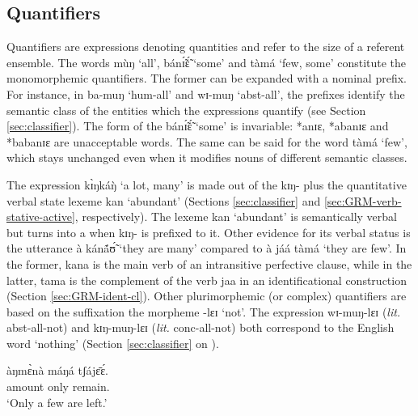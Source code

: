 \begin{exe}
\begin{exe}
\begin{exe}
\begin{exe}
\begin{exe}
\begin{exe}
\begin{exe}
\begin{exe}
\begin{exe}


\subsection{Quantifiers}
\label{sec:GRM-quantifier}



Quantifiers are expressions denoting quantities and refer to the size of a referent ensemble. The words {\sls mùŋ} `all',   {\sls bánɪ̃́ɛ̃́} `some' and {\sls tàmá} `few, some' constitute the  monomorphemic quantifiers. The  former can be expanded with a  nominal prefix. For instance, in {\sls ba-muŋ} `{\sc hum}-all' and {\sls wɪ-muŋ} `{\sc abst}-all',  the prefixes identify the semantic class of the entities which the expressions quantify (see Section \ref{sec:classifier}). The form of the  {\sls bánɪ̃́ɛ̃́} `some'  is  invariable: *{\sls anɪɛ}, *{\sls abanɪɛ} and *{\sls babanɪɛ} are unacceptable words.  The same can be said for the word {\sls tàmá} `few', which stays unchanged even  when it  modifies  nouns of different semantic classes. 

The expression {\sls kɪ̀ŋkáŋ̀} `a lot, many'   is made out of the    {\sls kɪŋ-} plus the quantitative verbal state lexeme {\sls kan}  `abundant'   (Sections  \ref{sec:classifier} and \ref{sec:GRM-verb-stative-active}, respectively). The  lexeme {\sls kan} `abundant'  is semantically verbal but turns into a  when {\sls kɪŋ-}  is prefixed to it.  Other evidence for its verbal status  is the utterance {\sls à kánã́ʊ̃́} `they are many' compared to {\sls à jáá tàmá} `they are few'.  In the former, {\sls kana} is the main verb of an intransitive perfective clause, while in the latter, {\sls tama} is the complement of the verb {\sls jaa} in an identificational construction  (Section \ref{sec:GRM-ident-cl}). Other plurimorphemic (or complex) quantifiers are based on the suffixation the morpheme {\sls  -lɛɪ} `not'. The expression {\sls wɪ-muŋ-lɛɪ} ({\it lit.} {\sc abst}-all-not) and {\sls kɪŋ-muŋ-lɛɪ} ({\it lit.} {\sc conc}-all-not)  both correspond to the English word `nothing' (Section \ref{sec:classifier} on ). 

\ea\label{ex:GRM-quant-int-only}
\gll àŋmɛ̀nà máŋá tʃájɛ̄ɛ́.\\
   amount only remain.{\pfv}\\
\glt `Only a few are left.'
\z


\end{exe}
\end{exe}
\end{exe}
\end{exe}
\end{exe}
\end{exe}
\end{exe}
\end{exe}
\end{exe}
